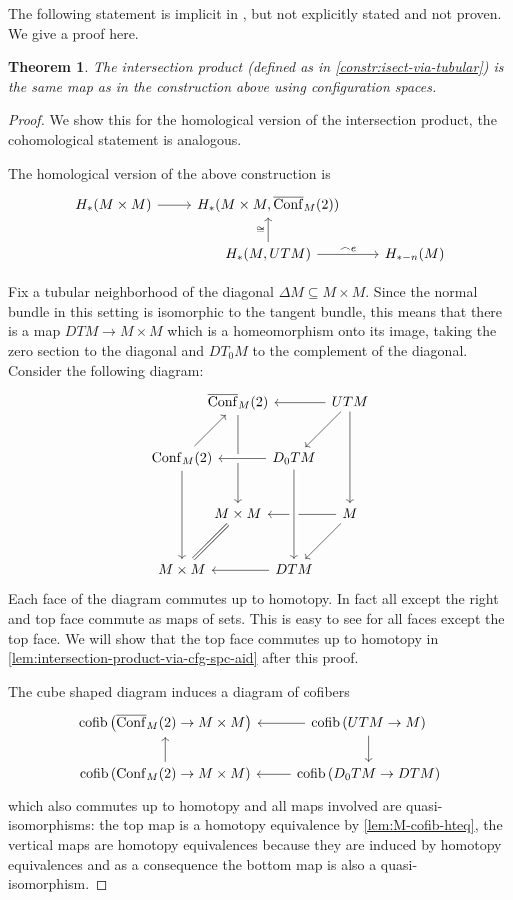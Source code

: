 \documentclass{scrartcl}
\theoremstyle{plain}
\newtheorem{theorem}{Theorem}[section]
\theoremstyle{definition}
\renewcommand{\subset}{\subseteq}
\newcommand{\capp}{\mathbin{\frown}}
\DeclareMathOperator{\cofib}{cofib}
\newcommand{\iso}{\cong}
\DeclareMathOperator{\Conf}{Conf}
\DeclareMathOperator{\cConf}{\overline{Conf}}
\begin{document}
The following statement is implicit in \cite{naef2019string}, but not explicitly stated and not proven. We give a proof here. 
\begin{theorem}\label{thm:intersection-product-via-cfg-spc}
    The intersection product (defined as in \cref{constr:isect-via-tubular}) is the same map as in the construction above using configuration spaces. 
\end{theorem}
\begin{proof}
    We show this for the homological version of the intersection product, the cohomological statement is analogous. 

    The homological version of the above construction is
    \begin{equation}
        \begin{tikzcd}
            H_*(M\times M) \rar & H_*(M\times M, \cConf_M(2)) &  \\
            & \uar["\iso"] H_*(M, UTM) \rar["\capp e"]&  H_{*-n}(M)
        \end{tikzcd}
    \end{equation}

    Fix a tubular neighborhood of the diagonal $\Delta M\subset M\times M$. Since the normal bundle in this setting is isomorphic to the tangent bundle, this means that there is a map $DTM \to M\times M$ which is a homeomorphism onto its image, taking the zero section to the diagonal and $DT_0M$ to the complement of the diagonal. 
    Consider the following diagram:
    \[\begin{tikzcd}[row sep={40,between origins}, column sep={40,between origins}]
      & \cConf_M(2)  \ar{dd} & &   UTM  \ar{dd}\ar{ll} \ar{dl} \\
      \Conf_M(2) \ar{ur} \ar{dd} & & \ar[crossing over]{ll} D_0TM \\
        & M\times M \ar[dl, equal] & &  M  \ar{ll}\ar{dl} \\
      M\times M && DTM \ar[from=uu,crossing over] \ar{ll}
   \end{tikzcd}\]
   Each face of the diagram commutes up to homotopy. In fact all except the right and top face commute as maps of sets. This is easy to see for all faces except the top face. We will show that the top face commutes up to homotopy in \cref{lem:intersection-product-via-cfg-spc-aid} after this proof. 
   
   
   The cube shaped diagram induces a diagram of cofibers
   \begin{equation}
    \begin{tikzcd}
        \cofib\left(\cConf_M(2)\to M\times M\right) & \lar \cofib\left(UTM\to M\right) \dar \\
        \cofib\left(\Conf_M(2) \to M\times M\right) \uar &\lar \cofib\left(D_0TM\to DTM\right)
    \end{tikzcd}
    \end{equation}
    which also commutes up to homotopy and all maps involved are quasi-isomorphisms: the top map is a homotopy equivalence by \cref{lem:M-cofib-hteq}, the vertical maps are homotopy equivalences because they are induced by homotopy equivalences and as a consequence the bottom map is also a quasi-isomorphism. 


\end{proof}
\end{document}
